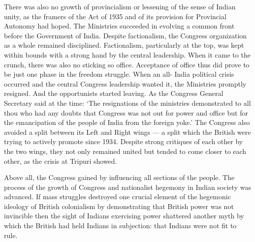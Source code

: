 There was also no growth of provincialism or lessening of the sense of Indian unity, as the framers of the Act of 1935 and of its provision for Provincial Autonomy had hoped. The Ministries succeeded in evolving a common front before the Government of India. Despite factionalism, the Congress organization as a whole remained disciplined. Factionalism, particularly at the top, was kept within bounds with a strong hand by the central leadership. When it came to the crunch, there was also no sticking so office. Acceptance of office thus did prove to be just one phase in the freedom struggle. When an all- India political crisis occurred and the central Congress leadership wanted it, the Ministries promptly resigned. And the opportunists started leaving. As the Congress General Secretary said at the time: `The resignations of the ministries demonstrated to all thou who had any doubts that Congress was not out for power and office but for the emancipation of the people of India from the foreign yoke.' The Congress also avoided a split between its Left and Right wings --- a split which the British were trying to actively promote since 1934. Despite strong critiques of each other by the two wings, they not only remained united but tended to come closer to each other, as the crisis at Tripuri showed. 

Above all, the Congress gained by influencing all sections of the people. The process of the growth of Congress and nationalist hegemony in Indian society was advanced. If mass struggles destroyed one crucial element of the hegemonic ideology of British colonialism by demonstrating that British power was not invincible then the sight of Indians exercising power shattered another myth by which the British had held Indians in subjection: that Indians were not fit to rule.
